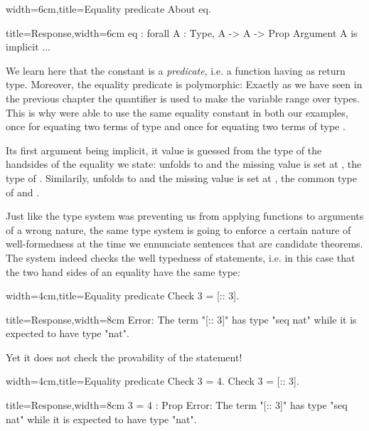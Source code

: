 \begin{coq}{width=6cm,title=Equality predicate}
About eq.
\end{coq}
\begin{coqout}{title=Response,width=6cm}
eq : forall A : Type, A -> A -> Prop
Argument A is implicit ...
\end{coqout}


We learn here that the constant  is a \emph{predicate}, i.e. a
function having  as return type. Moreover, the equality
predicate is polymorphic: Exactly as we have seen in the previous
chapter the  quantifier is used to make the variable 
range over types. This is why were able to use the same equality
constant in both our examples, once for equating two terms of type
 and once for equating two terms of type .

Its first argument being implicit, it value is guessed from the type
of the handsides of the equality we state:  unfolds to
 and the missing value is set at , the type of
. Similarily,  unfolds to
 and the missing value is set at
, the common type of  and .

Just like the type system was preventing
us from applying functions to arguments of a wrong nature, the same
type system is going to enforce a certain nature of well-formedness at
the time we ennunciate sentences that are candidate theorems.
The \Coq{} system indeed checks the well typedness of statements,
i.e. in this case that the two hand sides of an equality have the same
type:

\begin{coq}{width=4cm,title=Equality predicate}
Check 3 = [:: 3].
$~$
\end{coq}
\begin{coqout}{title=Response,width=8cm}
Error: The term "[:: 3]" has type "seq nat"
 while it is expected to have type "nat".
\end{coqout}

Yet it does not check the provability of the statement!

\begin{coq}{width=4cm,title=Equality predicate}
Check 3 = 4.
Check 3 = [:: 3].
$~$
\end{coq}
\begin{coqout}{title=Response,width=8cm}
3 = 4 : Prop
Error: The term "[:: 3]" has type "seq nat"
 while it is expected to have type "nat".
\end{coqout}

